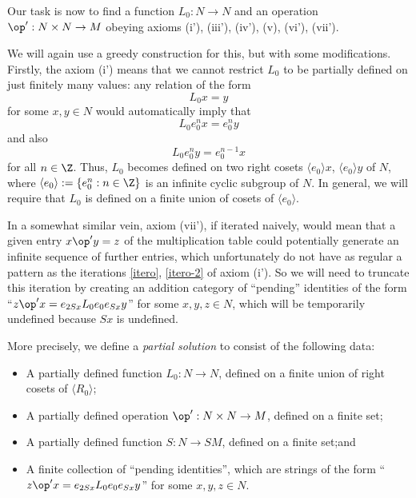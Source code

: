 Our task is now to find a function $L_0: N \to N$ and an operation $\op': N \times N \to M$ obeying axioms (i'), (iii'), (iv'), (v), (vi'), (vii').

We will again use a greedy construction for this, but with some modifications.  Firstly, the axiom (i') means that we cannot restrict $L_0$ to be partially defined on just finitely many values: any relation of the form
$$ L_0 x = y$$
for some $x,y \in N$ would automatically imply that
\begin{equation}\label{itero}
 L_0 e_0^n x = e_0^n y
\end{equation}
and also
\begin{equation}\label{itero-2}
  L_0 e_0^n y = e_0^{n-1} x
\end{equation}
for all $n \in \Z$.  Thus, $L_0$ becomes defined on two right cosets $\langle e_0 \rangle x$, $\langle e_0 \rangle y$ of $N$, where $\langle e_0 \rangle := \{ e_0^n: n \in \Z\}$ is an infinite cyclic subgroup of $N$.  In general, we will require that $L_0$ is defined on a finite union of cosets of $\langle e_0\rangle$.

In a somewhat similar vein, axiom (vii'), if iterated naively, would mean that a given entry $x \op' y = z$ of the multiplication table could potentially generate an infinite sequence of further entries, which unfortunately do not have as regular a pattern as the iterations \eqref{itero}, \eqref{itero-2} of axiom (i').  So we will need to truncate this iteration by creating an addition category of ``pending'' identities of the form ``$z \op' x = e_{2Sx} L_0 e_0 e_{Sx} y$'' for some $x,y,z \in N$, which will be temporarily undefined because $Sx$ is undefined.

More precisely, we define a \emph{partial solution} to consist of the following data:
\begin{itemize}
  \item A partially defined function $L_0: N \to N$, defined on a finite union of right cosets of $\langle R_0\rangle$;
  \item A partially defined operation $\op': N \times N \to M$, defined on a finite set;
  \item A partially defined function $S: N \to SM$, defined on a finite set;and
  \item A finite collection of ``pending identities'', which are strings of the form ``$z \op' x = e_{2Sx} L_0 e_0 e_{Sx} y$'' for some $x,y,z \in N$.
\end{itemize}

